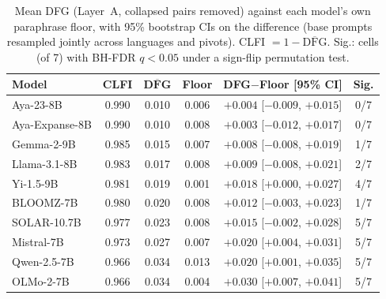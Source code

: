 \begin{table}[t]
\centering
\small
\caption{Mean DFG (Layer~A, collapsed pairs removed) against each model's own paraphrase floor, with 95\% bootstrap CIs on the difference (base prompts resampled jointly across languages and pivots). CLFI $=1-\overline{\text{DFG}}$. Sig.: cells (of 7) with BH-FDR $q<0.05$ under a sign-flip permutation test.}
\label{tab:clfi}
\setlength{\tabcolsep}{2.5pt}
\begin{tabular}{lccccc}
\toprule
\textbf{Model} & \textbf{CLFI} & $\overline{\textbf{DFG}}$ & \textbf{Floor} & \textbf{DFG$-$Floor} [95\% CI] & \textbf{Sig.} \\
\midrule
Aya-23-8B & 0.990 & 0.010 & 0.006 & $+0.004$ [$-0.009$, $+0.015$] & 0/7 \\
Aya-Expanse-8B & 0.990 & 0.010 & 0.008 & $+0.003$ [$-0.012$, $+0.017$] & 0/7 \\
Gemma-2-9B & 0.985 & 0.015 & 0.007 & $+0.008$ [$-0.008$, $+0.019$] & 1/7 \\
Llama-3.1-8B & 0.983 & 0.017 & 0.008 & $+0.009$ [$-0.008$, $+0.021$] & 2/7 \\
Yi-1.5-9B & 0.981 & 0.019 & 0.001 & $+0.018$ [$+0.000$, $+0.027$] & 4/7 \\
BLOOMZ-7B & 0.980 & 0.020 & 0.008 & $+0.012$ [$-0.003$, $+0.023$] & 1/7 \\
SOLAR-10.7B & 0.977 & 0.023 & 0.008 & $+0.015$ [$-0.002$, $+0.028$] & 5/7 \\
Mistral-7B & 0.973 & 0.027 & 0.007 & $+0.020$ [$+0.004$, $+0.031$] & 5/7 \\
Qwen-2.5-7B & 0.966 & 0.034 & 0.013 & $+0.020$ [$+0.001$, $+0.035$] & 5/7 \\
OLMo-2-7B & 0.966 & 0.034 & 0.004 & $+0.030$ [$+0.007$, $+0.041$] & 5/7 \\
\bottomrule
\end{tabular}
\end{table}
